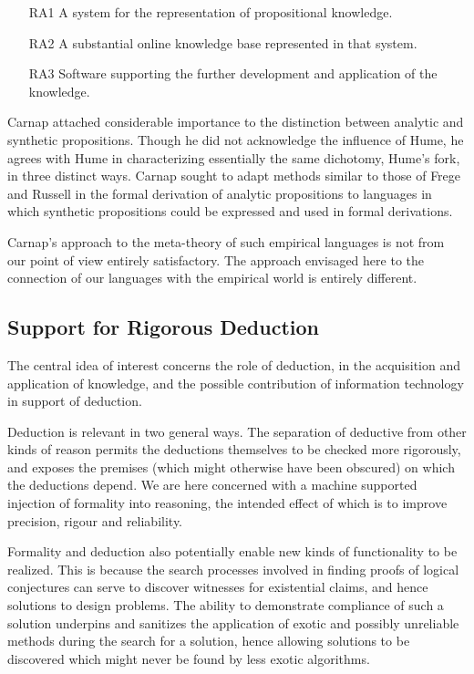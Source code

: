 \begin{itemize}
\item[RA1] A system for the representation of propositional knowledge.
\item[RA2] A substantial online knowledge base represented in that system.
\item[RA3] Software supporting the further development and application of the knowledge.
\end{itemize}

Carnap attached considerable importance to the distinction between
analytic and synthetic propositions.
Though he did not acknowledge the influence of Hume, he agrees with
Hume in characterizing essentially the same dichotomy, Hume's fork, in three
distinct ways.
Carnap sought to adapt methods similar to those of Frege and Russell
in the formal derivation of analytic propositions to languages in
which synthetic propositions could be expressed and used in formal
derivations.

Carnap's approach to the meta-theory of such empirical languages is not
from our point of view entirely satisfactory.
The approach envisaged here to the connection of our languages with
the empirical world is entirely different.

\subsection{Support for Rigorous Deduction}

The central idea of interest concerns the role of deduction, in the
acquisition and application of knowledge, and the possible
contribution of information technology in support of deduction.

Deduction is relevant in two general ways.
The separation of deductive from other kinds of reason permits the
deductions themselves to be checked more rigorously, and exposes the
premises (which might otherwise have been obscured) on which the
deductions depend.
We are here concerned with a machine supported injection of formality
into reasoning, the intended effect of which is to improve precision,
rigour and reliability.

Formality and deduction also potentially enable new kinds of
functionality to be realized.
This is because the search processes involved in finding proofs of
logical conjectures can serve to discover witnesses for existential
claims, and hence solutions to design problems.
The ability to demonstrate compliance of such a solution underpins
and sanitizes the application of exotic and possibly unreliable
methods during the search for a solution, hence allowing solutions to
be discovered which might never be found by less exotic algorithms.

